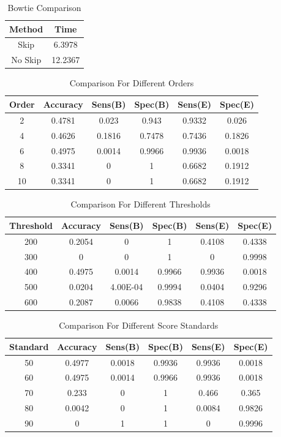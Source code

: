 \documentclass[12pt]{article} %
\begin{document}
\begin{table}
\centering
\begin{tabular}{|c|c|}
\hline
Method & Time \\
\hline
Skip & 6.3978 \\
\hline
No Skip & 12.2367 \\
\hline
\end{tabular}
\label{tab: bowtie}
\caption{Bowtie Comparison}
\end{table}

\begin{table}
\centering
\begin{tabular}{|c|c|c|c|c|c|}
\hline
Order & Accuracy & Sens(B) & Spec(B) & Sens(E) &  Spec(E) \\
\hline
2 & 0.4781 & 0.023 & 0.943 & 0.9332 & 0.026 \\
\hline
4 & 0.4626 & 0.1816 & 0.7478 & 0.7436 & 0.1826 \\
\hline
6 & 0.4975 & 0.0014 & 0.9966 & 0.9936 & 0.0018 \\
\hline
8 & 0.3341 & 0 & 1 & 0.6682 & 0.1912 \\
\hline
10 & 0.3341 & 0 & 1 & 0.6682 & 0.1912 \\
\hline
\end{tabular}
\caption{Comparison For Different Orders}
\label{tab: order}
\end{table}

\begin{table}
\centering
\begin{tabular}{|c|c|c|c|c|c|}
\hline
Threshold & Accuracy & Sens(B) & Spec(B) & Sens(E) &  Spec(E) \\
\hline
200 & 0.2054 & 0 & 1 & 0.4108 & 0.4338 \\
\hline
300 & 0 & 0 & 1 & 0 & 0.9998 \\
\hline
400 & 0.4975 & 0.0014 & 0.9966 & 0.9936 & 0.0018 \\
\hline
500 & 0.0204 & 4.00E-04 & 0.9994 & 0.0404 & 0.9296 \\
\hline
600 & 0.2087 & 0.0066 & 0.9838 & 0.4108 & 0.4338 \\
\hline
\end{tabular}
\caption{Comparison For Different Thresholds}
\label{tab: threshold}
\end{table}

\begin{table}
\centering
\begin{tabular}{|c|c|c|c|c|c|}
\hline
Standard & Accuracy & Sens(B) & Spec(B) & Sens(E) &  Spec(E) \\
\hline
50 & 0.4977 & 0.0018 & 0.9936 & 0.9936 & 0.0018 \\
\hline
60 & 0.4975 & 0.0014 & 0.9966 & 0.9936 & 0.0018 \\
\hline
70 & 0.233 & 0 & 1 & 0.466 & 0.365 \\
\hline
80 & 0.0042 & 0 & 1 & 0.0084 & 0.9826 \\
\hline
90 & 0 & 1 & 1 & 0 & 0.9996 \\
\hline
\end{tabular}
\caption{Comparison For Different Score Standards}
\label{tab: standard}
\end{table}
\end{document}
